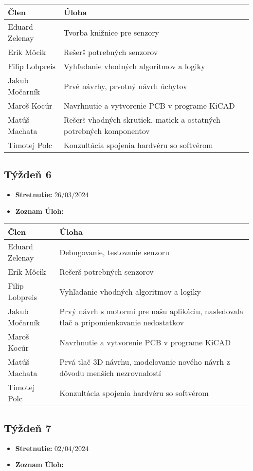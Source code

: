 \begin{tabular}{|l|l|}
    \hline
    \textbf{Člen} & \textbf{Úloha} \\
    \hline
    Eduard Zelenay & Tvorba knižnice pre senzory \\
    Erik Môcik & Rešerš potrebných senzorov \\
    Filip Lobpreis & Vyhľadanie vhodných algoritmov a logiky \\
    Jakub Močarník & Prvé návrhy, prvotný návrh úchytov \\
    Maroš Kocúr & Navrhnutie a vytvorenie PCB v programe KiCAD \\
    Matúš Machata & Rešerš vhodných skrutiek, matiek a ostatných potrebných komponentov \\
    Timotej Polc & Konzultácia spojenia hardvéru so softvérom \\
    \hline
\end{tabular}
\subsection{Týždeň 6}
\begin{itemize}
    \item \textbf{Stretnutie:} 26/03/2024
    \item \textbf{Zoznam Úloh:}
\end{itemize}

\begin{tabular}{|l|l|}
    \hline
    \textbf{Člen} & \textbf{Úloha} \\
    \hline
    Eduard Zelenay & Debugovanie, testovanie senzoru \\
    Erik Môcik & Rešerš potrebných senzorov \\
    Filip Lobpreis & Vyhľadanie vhodných algoritmov a logiky \\
    Jakub Močarník & Prvý návrh s motormi pre našu aplikáciu, nasledovala tlač a pripomienkovanie nedostatkov \\
    Maroš Kocúr & Navrhnutie a vytvorenie PCB v programe KiCAD \\
    Matúš Machata & Prvá tlač 3D návrhu, modelovanie nového návrh z dôvodu menších nezrovnalostí \\
    Timotej Polc & Konzultácia spojenia hardvéru so softvérom \\
    \hline
\end{tabular}
\subsection{Týždeň 7}
\begin{itemize}
    \item \textbf{Stretnutie:} 02/04/2024
    \item \textbf{Zoznam Úloh:}
\end{itemize}

